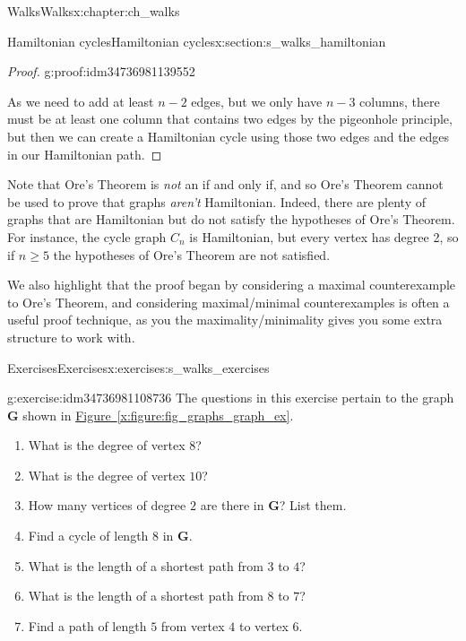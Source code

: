 \documentclass[oneside,10pt,]{book}
\newcommand{\xreffont}{\relax}
\numberwithin{equation}{section}
\newcommand{\bfG}{\mathbf{G}}
\begin{document}
\begin{chapterptx}{Walks}{}{Walks}{}{}{x:chapter:ch_walks}
\begin{sectionptx}{Hamiltonian cycles}{}{Hamiltonian cycles}{}{}{x:section:s_walks_hamiltonian}
\begin{proof}{}{g:proof:idm34736981139552}
\par
As we need to add at least \(n-2\) edges, but we only have \(n-3\) columns, there must be at least one column that contains two edges by the pigeonhole principle, but then we can create a Hamiltonian cycle using those two edges and the edges in our Hamiltonian path.%
\end{proof}
Note that Ore's Theorem is \emph{not} an if and only if, and so Ore's Theorem cannot be used to prove that graphs \emph{aren't} Hamiltonian.  Indeed, there are plenty of graphs that are Hamiltonian but do not satisfy the hypotheses of Ore's Theorem.  For instance, the cycle graph \(C_n\) is Hamiltonian, but every vertex has degree 2, so if \(n\geq 5\) the hypotheses of Ore's Theorem are not satisfied.%
\par
We also highlight that the proof began by considering a maximal counterexample to Ore's Theorem, and considering maximal\slash{}minimal counterexamples is often a useful proof technique, as you the maximality\slash{}minimality gives you some extra structure to work with.%
\end{sectionptx}
%
%
\typeout{************************************************}
\typeout{************************************************}
%
\begin{exercises-section}{Exercises}{}{Exercises}{}{}{x:exercises:s_walks_exercises}
\begin{divisionexercise}{1}{}{}{g:exercise:idm34736981108736}%
The questions in this exercise pertain to the graph \(\bfG\) shown in \hyperref[x:figure:fig_graphs_graph_ex]{Figure~{\xreffont\ref{x:figure:fig_graphs_graph_ex}}}.%
\begin{sidebyside}{2}{0.0125}{0.0125}{0.025}%
\begin{sbspanel}{0.6}%
%
\begin{enumerate}[label=(\alph*)]
\item{}What is the degree of vertex \(8\)?%
\item{}What is the degree of vertex \(10\)?%
\item{}How many vertices of degree \(2\) are there in \(\bfG\)? List them.%
\item{}Find a cycle of length \(8\) in \(\bfG\).%
\item{}What is the length of a shortest path from \(3\) to \(4\)?%
\item{}What is the length of a shortest path from \(8\) to \(7\)?%
\item{}Find a path of length \(5\) from vertex \(4\) to vertex \(6\).%

\end{enumerate}
\end{sbspanel}
\end{sidebyside}
\end{divisionexercise}
\end{exercises-section}
\end{chapterptx}
\end{document}
